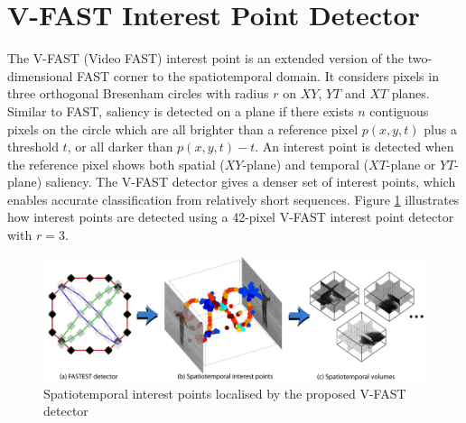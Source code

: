 \section{V-FAST Interest Point Detector}
\label{sec:fastest}
The V-FAST (Video FAST) interest point is an extended version of the two-dimensional FAST corner \cite{Rosten2006} to the spatiotemporal domain. It considers pixels in three orthogonal Bresenham circles with radius $r$ on $XY$, $YT$ and $XT$ planes. Similar to FAST, saliency is detected on a plane if there exists $n$ contiguous pixels on the circle which are all brighter than a reference pixel $p(x,y,t)$ plus a threshold $t$, or all darker than $p(x,y,t)-t$. An interest point is detected when the reference pixel shows both spatial ($XY$-plane) and temporal ($XT$-plane or $YT$-plane) saliency. The V-FAST detector gives a denser set of interest points, which enables accurate classification from relatively short sequences. Figure \ref{img:fastest} illustrates how interest points are detected using a 42-pixel V-FAST interest point detector with $r = 3$.
\vspace{-2mm}
\begin{figure}[h]
\centering
\includegraphics[width=0.8\linewidth]{fig/actreg/fig2_tot.pdf}%
\caption{Spatiotemporal interest points localised by the proposed V-FAST detector}
\label{img:fastest}
\end{figure}\vspace{-5mm}

